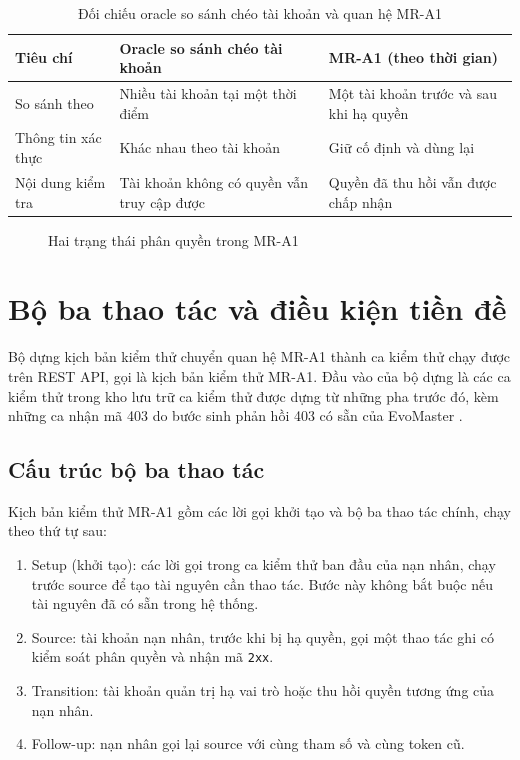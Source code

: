 \begin{table}[htbp]
  \centering
  \caption{Đối chiếu oracle so sánh chéo tài khoản và quan hệ MR-A1}
  \label{tab:temporal_vs_diff}
  \begin{tabularx}{\textwidth}{@{}l >{\raggedright\arraybackslash}X >{\raggedright\arraybackslash}X@{}}
    \toprule
    Tiêu chí & Oracle so sánh chéo tài khoản & MR-A1 (theo thời gian) \\
    \midrule
    So sánh theo & Nhiều tài khoản tại một thời điểm & Một tài khoản trước và sau khi hạ quyền \\
    Thông tin xác thực & Khác nhau theo tài khoản & Giữ cố định và dùng lại \\
    Nội dung kiểm tra & Tài khoản không có quyền vẫn truy cập được & Quyền đã thu hồi vẫn được chấp nhận \\
    \bottomrule
  \end{tabularx}
\end{table}

\begin{figure}[htbp]
  \centering
  
  \caption{Hai trạng thái phân quyền trong MR-A1}
  \label{fig:mr_a1_state_space}
\end{figure}

\section{Bộ ba thao tác và điều kiện tiền đề}
\label{sec:method_triple}

Bộ dựng kịch bản kiểm thử chuyển quan hệ MR-A1 thành ca kiểm thử chạy được trên REST API, gọi là kịch bản kiểm thử MR-A1. Đầu vào của bộ dựng là các ca kiểm thử trong kho lưu trữ ca kiểm thử được dựng từ những pha trước đó, kèm những ca nhận mã 403 do bước sinh phản hồi 403 có sẵn của EvoMaster \cite{evomaster611}.

\subsection{Cấu trúc bộ ba thao tác}
\label{subsec:method_triple_structure}

Kịch bản kiểm thử MR-A1 gồm các lời gọi khởi tạo và bộ ba thao tác chính, chạy theo thứ tự sau:
\begin{enumerate}
    \item Setup (khởi tạo): các lời gọi trong ca kiểm thử ban đầu của nạn nhân, chạy trước source để tạo tài nguyên cần thao tác. Bước này không bắt buộc nếu tài nguyên đã có sẵn trong hệ thống.
    \item Source: tài khoản nạn nhân, trước khi bị hạ quyền, gọi một thao tác ghi có kiểm soát phân quyền và nhận mã \texttt{2xx}.
    \item Transition: tài khoản quản trị hạ vai trò hoặc thu hồi quyền tương ứng của nạn nhân.
    \item Follow-up: nạn nhân gọi lại source với cùng tham số và cùng token cũ.
\end{enumerate}

